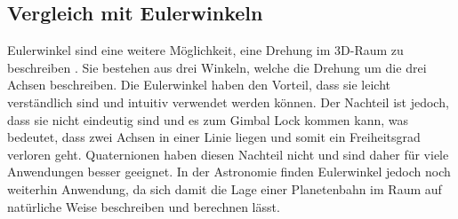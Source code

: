 \subsection{Vergleich mit Eulerwinkeln}
Eulerwinkel sind eine weitere Möglichkeit, eine Drehung im 3D-Raum 
zu beschreiben \cite{qa:linalg-euler}. Sie bestehen aus drei Winkeln, welche die Drehung 
um die drei Achsen beschreiben. Die Eulerwinkel haben den Vorteil, 
dass sie leicht verständlich sind und intuitiv verwendet werden 
können. Der Nachteil ist jedoch, dass sie nicht eindeutig sind und 
es zum Gimbal Lock kommen kann, was bedeutet, dass zwei Achsen in 
einer Linie liegen und somit ein Freiheitsgrad verloren geht. 
Quaternionen haben diesen Nachteil nicht und sind daher für viele 
Anwendungen besser geeignet. In der Astronomie finden Eulerwinkel 
jedoch noch weiterhin Anwendung, da sich damit die Lage einer 
Planetenbahn im Raum auf natürliche Weise beschreiben und berechnen
lässt.